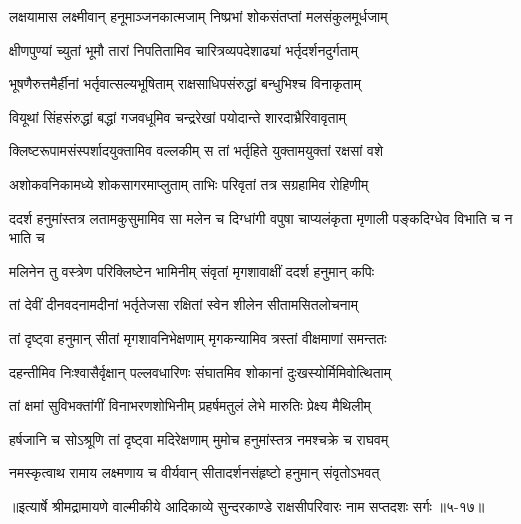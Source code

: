 \twolineshloka
{लक्षयामास लक्ष्मीवान् हनूमाञ्जनकात्मजाम्}
{निष्प्रभां शोकसंतप्तां मलसंकुलमूर्धजाम्} %

\twolineshloka
{क्षीणपुण्यां च्युतां भूमौ तारां निपतितामिव}
{चारित्रव्यपदेशाढ्यां भर्तृदर्शनदुर्गताम्} %

\twolineshloka
{भूषणैरुत्तमैर्हीनां भर्तृवात्सल्यभूषिताम्}
{राक्षसाधिपसंरुद्धां बन्धुभिश्च विनाकृताम्} %

\twolineshloka
{वियूथां सिंहसंरुद्धां बद्धां गजवधूमिव}
{चन्द्ररेखां पयोदान्ते शारदाभ्रैरिवावृताम्} %

\twolineshloka
{क्लिष्टरूपामसंस्पर्शादयुक्तामिव वल्लकीम्}
{स तां भर्तृहिते युक्तामयुक्तां रक्षसां वशे} %

\twolineshloka
{अशोकवनिकामध्ये शोकसागरमाप्लुताम्}
{ताभिः परिवृतां तत्र सग्रहामिव रोहिणीम्} %

\threelineshloka
{ददर्श हनुमांस्तत्र लतामकुसुमामिव}
{सा मलेन च दिग्धांगी वपुषा चाप्यलंकृता}
{मृणाली पङ्कदिग्धेव विभाति च न भाति च} %

\twolineshloka
{मलिनेन तु वस्त्रेण परिक्लिष्टेन भामिनीम्}
{संवृतां मृगशावाक्षीं ददर्श हनुमान् कपिः} %

\twolineshloka
{तां देवीं दीनवदनामदीनां भर्तृतेजसा}
{रक्षितां स्वेन शीलेन सीतामसितलोचनाम्} %

\twolineshloka
{तां दृष्ट्वा हनुमान् सीतां मृगशावनिभेक्षणाम्}
{मृगकन्यामिव त्रस्तां वीक्षमाणां समन्ततः} %

\twolineshloka
{दहन्तीमिव निःश्वासैर्वृक्षान् पल्लवधारिणः}
{संघातमिव शोकानां दुःखस्योर्मिमिवोत्थिताम्} %

\twolineshloka
{तां क्षमां सुविभक्तांगीं विनाभरणशोभिनीम्}
{प्रहर्षमतुलं लेभे मारुतिः प्रेक्ष्य मैथिलीम्} %

\twolineshloka
{हर्षजानि च सोऽश्रूणि तां दृष्ट्वा मदिरेक्षणाम्}
{मुमोच हनुमांस्तत्र नमश्चक्रे च राघवम्} %

\twolineshloka
{नमस्कृत्वाथ रामाय लक्ष्मणाय च वीर्यवान्}
{सीतादर्शनसंहृष्टो हनुमान् संवृतोऽभवत्} %


॥इत्यार्षे श्रीमद्रामायणे वाल्मीकीये आदिकाव्ये सुन्दरकाण्डे राक्षसीपरिवारः नाम सप्तदशः सर्गः ॥५-१७॥
